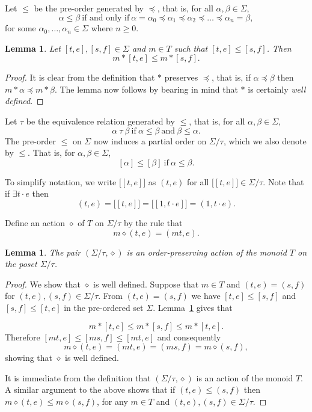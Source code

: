 \documentclass[12pt]{amsart}
\newtheorem{lem}[them]{Lemma}
\theoremstyle{definition}
\theoremstyle{definition}
\numberwithin{them}{section}
\numberwithin{equation}{section}
\begin{document}
Let $\leq$ be the pre-order generated by $\preceq$, that is, for all $\alpha, \beta \in \Sigma$,
\[\alpha \leq \beta \ \mbox{if and only if}\ \alpha = \alpha_0 \preceq \alpha_1 \preceq \alpha_2 \preceq \dots \preceq \alpha_n = \beta,\]
for some $\alpha_0, \dots, \alpha_n \in \Sigma$
where $n\geq 0$. 

\begin{lem}\label{lem:preservingorder} Let $[t,e],[s,f]\in \Sigma$ and $m\in T$ such that
$[t,e] \leq [s,f]$. Then \[m\ast [t,e] \leq m \ast [s,f].\]
\end{lem}
\begin{proof} It is clear from the definition that $\ast$ preserves $\preceq$, that is, if 
$\alpha\preceq \beta$ then $m\ast \alpha \preceq m\ast \beta$. The lemma now follows by bearing in mind that $\ast$ is certainly {\em well defined}.
\end{proof}

Let $\tau$ be the equivalence relation generated by $\leq$, that is, for all $\alpha, \beta \in \Sigma$,
\[\alpha\ \tau\ \beta \ \mbox{if}\ \alpha \leq \beta\ \mbox{and}\ \beta \leq \alpha.\]
The pre-order $\leq$ on $\Sigma$ now induces a partial order on  $\Sigma/\tau$, which we also denote by $\leq$. That is, for  $\alpha, \beta \in \Sigma$,
\[[\alpha] \leq [\beta] \ \mbox{if}\ \alpha \leq \beta.\]

To simplify notation, we write $\big[[t, e]\big]$ as $(t,e)$ for all $\big[[t, e]\big]\in \Sigma/\tau$.
Note that if $\exists t\cdot e$ then
\[(t,e)=\big[[t, e]\big]=\big[[1, t\cdot e]\big]=(1, t\cdot e).\]


Define  an action $\diamond$ of $T$ on $\Sigma/\tau$ by the rule that
\[m \diamond (t,e) = (mt,e).\]


\begin{lem}\label{star well defined}  The pair $(\Sigma/\tau,\diamond)$ is an order-preserving action of the monoid $T$ on the poset $\Sigma/\tau$.  
\end{lem}
\begin{proof} 
We  show that $\diamond$ is well defined. 
Suppose that $m \in T$ and $(t,e) = (s,f)$ for $(t,e),(s,f) \in \Sigma/\tau$. From $(t,e)=(s,f)$ we have  $[t, e] \leq [s, f]$ and $[s,f]\leq [t, e]$
in the pre-ordered set $\Sigma$.  Lemma~\ref{lem:preservingorder} gives that 

\[m\ast [t,e]\leq m\ast [s,f]\leq m\ast[t,e].\] Therefore $[mt, e] \leq [ms, f]\leq [mt,e]$ and consequently
\[m\diamond (t,e)=(mt, e) = (ms, f)=m\diamond (s,f),\] showing that $\diamond$ is well defined.  

It is immediate from the definition that $(\Sigma/\tau,\diamond)$ is an action of the monoid $T$. A similar argument to the above shows that if $(t,e)\leq (s,f)$ then  $m\diamond (t,e)\leq m\diamond(s,f)$, for any $m\in T$ and $(t,e),(s,f)\in \Sigma/\tau$. 
\end{proof}
\end{document}
